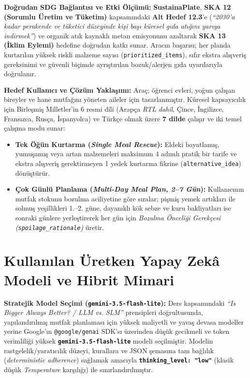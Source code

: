 \documentclass[9pt,a4paper]{article}
\begin{document}
\textbf{Doğrudan SDG Bağlantısı ve Etki Ölçümü:} \textbf{SustainaPlate}, \textbf{SKA 12 (Sorumlu Üretim ve Tüketim)} kapsamındaki \textbf{Alt Hedef 12.3}'e (\emph{``2030'a kadar perakende ve tüketici düzeyinde kişi başı küresel gıda atığını yarıya indirmek''}) ve organik atık kaynaklı metan emisyonunu azaltarak \textbf{SKA 13 (İklim Eylemi)} hedefine doğrudan katkı sunar. Aracın başarısı; her planda kurtarılan yüksek riskli malzeme sayısı (\texttt{prioritized\_items}), sıfır ekstra alışveriş gereksinimi ve güvenli biçimde ayrıştırılan bozuk/alerjen gıda uyarılarıyla doğrulanır.

\textbf{Hedef Kullanıcı ve Çözüm Yaklaşımı:} Araç; öğrenci evleri, yoğun çalışan bireyler ve hane mutfağını yöneten aileler için tasarlanmıştır. Küresel kapsayıcılık için Birleşmiş Milletler'in 6 resmi dili (Arapça \emph{RTL dahil}, Çince, İngilizce, Fransızca, Rusça, İspanyolca) ve Türkçe olmak üzere \textbf{7 dilde} çalışır ve iki temel çalışma modu sunar:
\begin{itemize}
  \item \textbf{Tek Öğün Kurtarma (\emph{Single Meal Rescue}):} Eldeki bayatlamış, yumuşamış veya artan malzemeleri maksimum 4 adımlı pratik bir tarife ve ekstra alışveriş gerektirmeyen 1 yedek kurtarma fikrine (\texttt{alternative\_idea}) dönüştürür.
  \item \textbf{Çok Günlü Planlama (\emph{Multi-Day Meal Plan, 2--7 Gün}):} Kullanıcının mutfak stokunu bozulma aciliyetine göre sıralar; pişmiş yemek artıkları ile solmuş yeşillikleri 1.--2. güne, dayanıklı kök sebze ve kuru bakliyatları ise sonraki günlere yerleştirerek her gün için \emph{Bozulma Önceliği Gerekçesi (\texttt{spoilage\_rationale})} üretir.
\end{itemize}

\section{Kullanılan Üretken Yapay Zekâ Modeli ve Hibrit Mimari}
\textbf{Stratejik Model Seçimi (\texttt{gemini-3.5-flash-lite}):} Ders kapsamındaki \emph{``Is Bigger Always Better? / LLM vs. SLM''} prensipleri doğrultusunda, yapılandırılmış mutfak planlaması için yüksek maliyetli ve yavaş devasa modeller yerine Google'ın \texttt{@google/genai} SDK'sı üzerinden düşük gecikmeli ve token verimliliği yüksek \textbf{\texttt{gemini-3.5-flash-lite}} modeli seçilmiştir. Modelin rastgelelik/yaratıcılık düzeyi, kurallara ve JSON şemasına tam bağlılık (\emph{deterministic adherence}) sağlamak amacıyla \textbf{\texttt{thinking\_level: "low"}} (klasik düşük \emph{Temperature} karşılığı) ile sınırlandırılmıştır.
\end{document}
